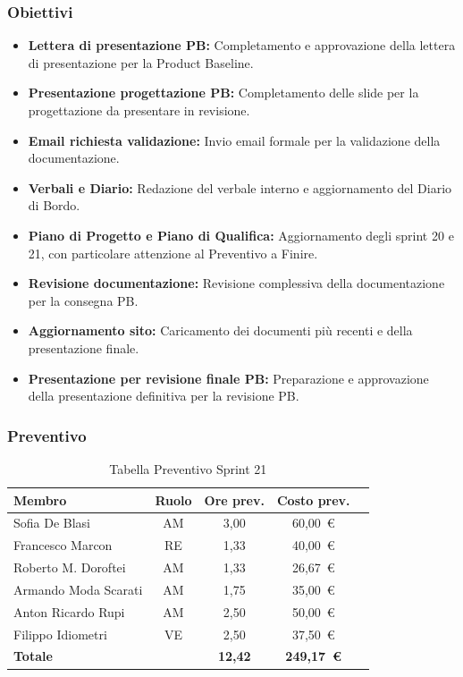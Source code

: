 \subsubsection{Obiettivi}
\begin{itemize}
    \item \textbf{Lettera di presentazione PB:} Completamento e approvazione della lettera di presentazione per la Product Baseline.
    \item \textbf{Presentazione progettazione PB:} Completamento delle slide per la progettazione da presentare in revisione.
    \item \textbf{Email richiesta validazione:} Invio email formale per la validazione della documentazione.
    \item \textbf{Verbali e Diario:} Redazione del verbale interno e aggiornamento del Diario di Bordo.
    \item \textbf{Piano di Progetto e Piano di Qualifica:} Aggiornamento degli sprint 20 e 21, con particolare attenzione al Preventivo a Finire.
    \item \textbf{Revisione documentazione:} Revisione complessiva della documentazione per la consegna PB.
    \item \textbf{Aggiornamento sito:} Caricamento dei documenti più recenti e della presentazione finale.
    \item \textbf{Presentazione per revisione finale PB:} Preparazione e approvazione della presentazione definitiva per la revisione PB.
\end{itemize}

\subsubsection{Preventivo}
\begin{table}[H]
    \centering
    \renewcommand{\arraystretch}{1.3}
    \begin{tabularx}{\textwidth}{|X|c|c|c|r|}
        \hline
        \textbf{Membro} & \textbf{Ruolo} & \textbf{Ore prev.} & \textbf{Costo prev.} \\
        \hline
        Sofia De Blasi           & AM & 3,00 & 60{,}00~\euro \\
        Francesco Marcon         & RE & 1,33 & 40{,}00~\euro \\
        Roberto M. Doroftei      & AM & 1,33 & 26{,}67~\euro \\
        Armando Moda Scarati     & AM & 1,75 & 35{,}00~\euro \\
        Anton Ricardo Rupi       & AM & 2,50 & 50{,}00~\euro \\
        Filippo Idiometri        & VE & 2,50 & 37{,}50~\euro \\
        \hline
        \textbf{Totale}          &    & \textbf{12,42} & \textbf{249{,}17~\euro} \\
        \hline
    \end{tabularx}
    \caption{Tabella Preventivo Sprint 21} 
\end{table}


